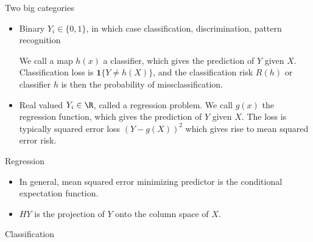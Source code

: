 \documentclass[12pt]{article}
\theoremstyle{plain}
\theoremstyle{definition}
\theoremstyle{remark}
\begin{document}
Two big categories
\begin{itemize}
  \item Binary $Y_i\in\{0,1\}$, in which case classification,
    discrimination, pattern recognition

    We call a map $h(x)$ a classifier, which gives the prediction of $Y$
    given $X$.
    Classification loss is $\mathbf{1}\{Y\neq h(X)\}$, and the
    classification risk $R(h)$ or classifier $h$ is then the probability
    of missclassification.

  \item Real valued $Y_i\in \R$, called a regression problem.
    We call $g(x)$ the regression function, which gives the prediction
    of $Y$ given $X$.
    The loss is typically squared error loss $(Y-g(X))^2$ which gives
    rise to mean squared error risk.
\end{itemize}
Regression
\begin{itemize}
  \item In general, mean squared error minimizing predictor is the
    conditional expectation function.
  \item $HY$ is the projection of $Y$ onto the column space of $X$.
\end{itemize}
Classification
\end{document}
